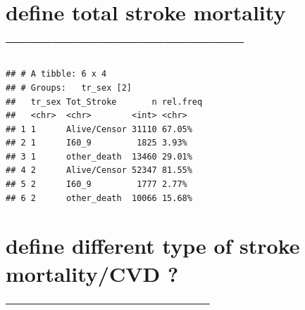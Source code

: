 \documentclass[]{article}
\newenvironment{Shaded}{\begin{snugshade}}{\end{snugshade}}
\newcommand{\DataTypeTok}[1]{\textcolor[rgb]{0.13,0.29,0.53}{#1}}
\newcommand{\DecValTok}[1]{\textcolor[rgb]{0.00,0.00,0.81}{#1}}
\newcommand{\KeywordTok}[1]{\textcolor[rgb]{0.13,0.29,0.53}{\textbf{#1}}}
\newcommand{\NormalTok}[1]{#1}
\newcommand{\OperatorTok}[1]{\textcolor[rgb]{0.81,0.36,0.00}{\textbf{#1}}}
\newcommand{\StringTok}[1]{\textcolor[rgb]{0.31,0.60,0.02}{#1}}
\begin{document}
\hypertarget{define-total-stroke-mortality}{%
\section{define total stroke mortality
--------------------------------}\label{define-total-stroke-mortality}}

\begin{Shaded}
\end{Shaded}

\begin{verbatim}
## # A tibble: 6 x 4
## # Groups:   tr_sex [2]
##   tr_sex Tot_Stroke       n rel.freq
##   <chr>  <chr>        <int> <chr>   
## 1 1      Alive/Censor 31110 67.05%  
## 2 1      I60_9         1825 3.93%   
## 3 1      other_death  13460 29.01%  
## 4 2      Alive/Censor 52347 81.55%  
## 5 2      I60_9         1777 2.77%   
## 6 2      other_death  10066 15.68%
\end{verbatim}

\hypertarget{define-different-type-of-stroke-mortalitycvd}{%
\section{define different type of stroke mortality/CVD
?---------------------------}\label{define-different-type-of-stroke-mortalitycvd}}
\end{document}
